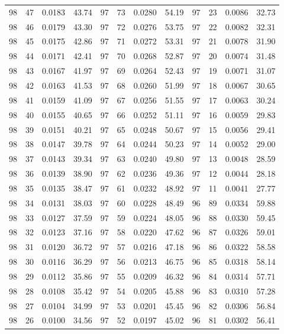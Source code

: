 \begin{tabular}{llll|llll|llll}
98 & 47 & 0.0183 & 43.74 & 97 & 73 & 0.0280 & 54.19 & 97 & 23 & 0.0086 & 32.73\\
98 & 46 & 0.0179 & 43.30 & 97 & 72 & 0.0276 & 53.75 & 97 & 22 & 0.0082 & 32.31\\
98 & 45 & 0.0175 & 42.86 & 97 & 71 & 0.0272 & 53.31 & 97 & 21 & 0.0078 & 31.90\\
98 & 44 & 0.0171 & 42.41 & 97 & 70 & 0.0268 & 52.87 & 97 & 20 & 0.0074 & 31.48\\
98 & 43 & 0.0167 & 41.97 & 97 & 69 & 0.0264 & 52.43 & 97 & 19 & 0.0071 & 31.07\\
98 & 42 & 0.0163 & 41.53 & 97 & 68 & 0.0260 & 51.99 & 97 & 18 & 0.0067 & 30.65\\
98 & 41 & 0.0159 & 41.09 & 97 & 67 & 0.0256 & 51.55 & 97 & 17 & 0.0063 & 30.24\\
98 & 40 & 0.0155 & 40.65 & 97 & 66 & 0.0252 & 51.11 & 97 & 16 & 0.0059 & 29.83\\
98 & 39 & 0.0151 & 40.21 & 97 & 65 & 0.0248 & 50.67 & 97 & 15 & 0.0056 & 29.41\\
98 & 38 & 0.0147 & 39.78 & 97 & 64 & 0.0244 & 50.23 & 97 & 14 & 0.0052 & 29.00\\
98 & 37 & 0.0143 & 39.34 & 97 & 63 & 0.0240 & 49.80 & 97 & 13 & 0.0048 & 28.59\\
98 & 36 & 0.0139 & 38.90 & 97 & 62 & 0.0236 & 49.36 & 97 & 12 & 0.0044 & 28.18\\
98 & 35 & 0.0135 & 38.47 & 97 & 61 & 0.0232 & 48.92 & 97 & 11 & 0.0041 & 27.77\\
98 & 34 & 0.0131 & 38.03 & 97 & 60 & 0.0228 & 48.49 & 96 & 89 & 0.0334 & 59.88\\
98 & 33 & 0.0127 & 37.59 & 97 & 59 & 0.0224 & 48.05 & 96 & 88 & 0.0330 & 59.45\\
98 & 32 & 0.0123 & 37.16 & 97 & 58 & 0.0220 & 47.62 & 96 & 87 & 0.0326 & 59.01\\
98 & 31 & 0.0120 & 36.72 & 97 & 57 & 0.0216 & 47.18 & 96 & 86 & 0.0322 & 58.58\\
98 & 30 & 0.0116 & 36.29 & 97 & 56 & 0.0213 & 46.75 & 96 & 85 & 0.0318 & 58.14\\
98 & 29 & 0.0112 & 35.86 & 97 & 55 & 0.0209 & 46.32 & 96 & 84 & 0.0314 & 57.71\\
98 & 28 & 0.0108 & 35.42 & 97 & 54 & 0.0205 & 45.88 & 96 & 83 & 0.0310 & 57.28\\
98 & 27 & 0.0104 & 34.99 & 97 & 53 & 0.0201 & 45.45 & 96 & 82 & 0.0306 & 56.84\\
98 & 26 & 0.0100 & 34.56 & 97 & 52 & 0.0197 & 45.02 & 96 & 81 & 0.0302 & 56.41\\

\end{tabular}
